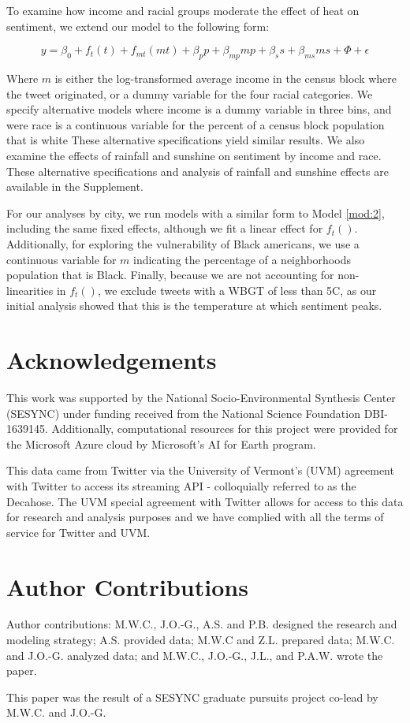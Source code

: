 \documentclass[fleqn,10pt]{wlscirep}
\begin{document}
To examine how income and racial groups moderate the effect of heat on sentiment, we extend our model to the following form:

\begin{equation}
    y = \beta_0 + f_t(t) + f_{mt}(m t) + \beta_p p + \beta_{mp} m p + \beta_s s + \beta_{ms} m s + \Phi + \epsilon
    \label{mod:2}
\end{equation}

Where $m$ is either the log-transformed average income in the census block where the tweet originated, or a dummy variable for the four racial categories.  We specify alternative models where income is a dummy variable in three bins, and were race is a continuous variable for the percent of a census block population that is white These alternative specifications yield similar results.  We also examine the effects of rainfall and sunshine on sentiment by income and race.  These alternative specifications and analysis of rainfall and sunshine effects are available in the Supplement.

For our analyses by city, we run models with a similar form to Model \ref{mod:2}, including the same fixed effects, although we fit a linear effect for $f_t()$.  Additionally, for exploring the vulnerability of Black americans, we use a continuous variable for $m$ indicating the percentage of a neighborhoods population that is Black.  Finally, because we are not accounting for non-linearities in $f_t()$, we exclude tweets with a WBGT of less than 5\textdegree C, as our initial analysis showed that this is the temperature at which sentiment peaks.

\section*{Acknowledgements}
This work was supported by the National Socio-Environmental Synthesis Center (SESYNC) under funding received from the National Science Foundation DBI-1639145.  Additionally, computational resources for this project were provided for the Microsoft Azure cloud by Microsoft's AI for Earth program.

This data came from Twitter via the University of Vermont’s (UVM) agreement with Twitter to access its streaming API - colloquially referred to as the Decahose.  The UVM special agreement with Twitter allows for access to this data for research and analysis purposes and we have complied with all the terms of service for Twitter and UVM. 



\section*{Author Contributions}
Author contributions: M.W.C., J.O.-G., A.S. and P.B. designed the research and modeling strategy; A.S. provided data; M.W.C and Z.L. prepared data; M.W.C. and J.O.-G. analyzed data; and M.W.C., J.O.-G., J.L., and P.A.W. wrote the paper.

\noindent This paper was the result of a SESYNC graduate pursuits project co-lead by M.W.C. and J.O.-G.
\end{document}
